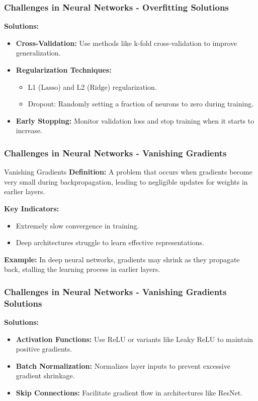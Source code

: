 \documentclass{beamer}
\begin{document}
\begin{frame}[fragile]
    \frametitle{Challenges in Neural Networks - Overfitting Solutions}
    \textbf{Solutions:}
    \begin{itemize}
        \item \textbf{Cross-Validation:} Use methods like k-fold cross-validation to improve generalization.
        \item \textbf{Regularization Techniques:}
            \begin{itemize}
                \item L1 ($\text{Lasso}$) and L2 ($\text{Ridge}$) regularization.
                \item Dropout: Randomly setting a fraction of neurons to zero during training.
            \end{itemize}
        \item \textbf{Early Stopping:} Monitor validation loss and stop training when it starts to increase.
    \end{itemize}
\end{frame}

\begin{frame}[fragile]
    \frametitle{Challenges in Neural Networks - Vanishing Gradients}
    \begin{block}{Vanishing Gradients}
        \textbf{Definition:} A problem that occurs when gradients become very small during backpropagation, leading to negligible updates for weights in earlier layers.
        
        \textbf{Key Indicators:}
        \begin{itemize}
            \item Extremely slow convergence in training.
            \item Deep architectures struggle to learn effective representations.
        \end{itemize}
        
        \textbf{Example:} 
        In deep neural networks, gradients may shrink as they propagate back, stalling the learning process in earlier layers.
    \end{block}
\end{frame}

\begin{frame}[fragile]
    \frametitle{Challenges in Neural Networks - Vanishing Gradients Solutions}
    \textbf{Solutions:}
    \begin{itemize}
        \item \textbf{Activation Functions:} Use ReLU or variants like Leaky ReLU to maintain positive gradients.
        \item \textbf{Batch Normalization:} Normalizes layer inputs to prevent excessive gradient shrinkage.
        \item \textbf{Skip Connections:} Facilitate gradient flow in architectures like ResNet.
    \end{itemize}
\end{frame}
\end{document}
